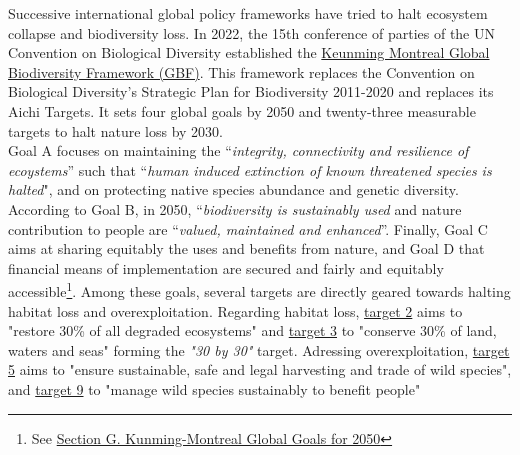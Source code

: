 Successive international global policy frameworks have tried to halt ecosystem collapse and biodiversity loss. In 2022, the 15th conference of parties of the UN Convention on Biological Diversity established the \href{https://www.cbd.int/doc/c/e6d3/cd1d/daf663719a03902a9b116c34/cop-15-l-25-en.pdf}{Keunming Montreal Global Biodiversity Framework (GBF)}. This framework replaces the Convention on Biological Diversity's Strategic Plan for Biodiversity 2011-2020 and replaces its Aichi Targets. It sets  four global goals by 2050 and twenty-three measurable targets to halt nature loss by 2030.\\
Goal A focuses on maintaining the ``\textit{integrity, connectivity and resilience of ecoystems}'' such that ``\textit{human induced extinction of known threatened species is halted}",  and on protecting native species abundance and genetic diversity. According to Goal B, in 2050,  ``\textit{biodiversity is sustainably used} and nature contribution to people \citep{DIAZ20151, ipbes_2022_6417333} are ``\textit{valued, maintained and enhanced}''. Finally, Goal C aims at sharing equitably  the uses and benefits from nature, and Goal D that financial means of implementation are secured and fairly and equitably accessible\footnote{See \href{https://www.cbd.int/doc/c/e6d3/cd1d/daf663719a03902a9b116c34/cop-15-l-25-en.pdf}{Section G. Kunming-Montreal Global Goals for 2050}}. Among these goals, several targets are directly geared towards halting habitat loss and overexploitation. Regarding habitat loss, \href{https://www.cbd.int/gbf/targets/2}{target 2} aims to "restore 30\% of all degraded ecosystems" and \href{https://www.cbd.int/gbf/targets/3}{target 3} to "conserve 30\% of land, waters and seas" forming the \textit{"30 by 30" }target. Adressing overexploitation, \href{https://www.cbd.int/gbf/targets/5}{target 5} aims to "ensure sustainable, safe and legal harvesting and trade of wild species", and \href{https://www.cbd.int/gbf/targets/9}{target 9} to "manage wild species sustainably to benefit people"




